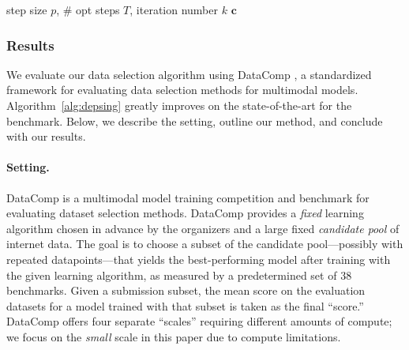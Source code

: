 \begin{algorithm}[h]
    \DontPrintSemicolon
    \nonl{} step size $p$, \# opt steps $T$, iteration number $k$ \;
	\Return $\mathbf{c}$ 
	\caption{Dataset selection using using metagradient descent (MGD).}
    \label{alg:depsing}
\end{algorithm}

\subsubsection{Results}
We evaluate our data selection algorithm using DataComp
\cite{gadre2024datacomp}, a standardized framework for evaluating data selection
methods for multimodal models. Algorithm~\ref{alg:depsing} greatly
improves on the state-of-the-art for the benchmark. Below, we
describe the setting, outline our
method, and conclude with our results.

\paragraph{Setting.}
DataComp \citep{gadre2024datacomp} is a multimodal model training competition 
and benchmark for evaluating dataset selection methods. 
DataComp provides a \textit{fixed} learning algorithm
chosen in advance by the organizers and a large fixed \emph{candidate pool} of
internet data. The goal is to choose a subset of the
candidate pool---possibly with repeated datapoints---that yields the best-performing
model after training with the given learning algorithm, as measured by a
predetermined set of 38 benchmarks. Given a submission subset, the mean score on
the evaluation datasets for a model trained with that subset is taken as the
final ``score.''  DataComp offers four separate ``scales'' requiring different
amounts of compute; we focus on the \emph{small} scale in this paper
due to compute limitations.

